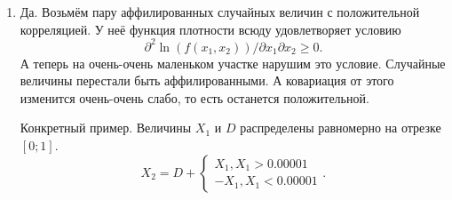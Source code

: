 \begin{enumerate}
\item Да. Возьмём пару аффилированных случайных величин с положительной  корреляцией. У неё функция плотности всюду удовлетворяет условию
\begin{equation}
\partial^{2}\ln (f(x_{1},x_{2}))/\partial x_{1}\partial x_{2} \geq 0.
\end{equation}
А теперь на очень-очень маленьком участке нарушим это условие. Случайные величины перестали быть аффилированными. А ковариация от этого изменится очень-очень слабо, то есть останется положительной.

Конкретный пример. Величины $ X_{1} $  и $D$ распределены  равномерно на отрезке $ [0;1] $.
\begin{equation}
X_{2}=D+
\begin{cases}
X_{1}, X_{1}>0.00001 \\
-X_{1}, X_{1}<0.00001
\end{cases}.
\end{equation}


\end{enumerate}

